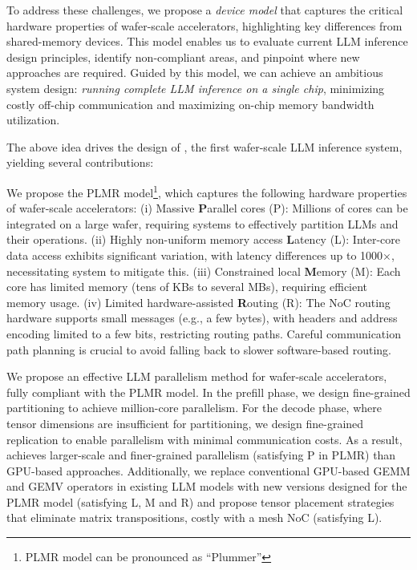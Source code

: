 To address these challenges, we propose a \emph{device model} that captures the critical hardware properties of wafer-scale accelerators, highlighting key differences from shared-memory devices. This model enables us to evaluate current LLM inference design principles, identify non-compliant areas, and pinpoint where new approaches are required. Guided by this model, we can achieve an ambitious system design: \emph{running complete LLM inference on a single chip}, minimizing costly off-chip communication and maximizing on-chip memory bandwidth utilization.

The above idea drives the design of \sys, the first wafer-scale LLM inference system, yielding several contributions:

We propose the PLMR model\footnote{PLMR model can be pronounced as “Plummer” }, which captures the following hardware properties of wafer-scale accelerators:
(i) Massive \textbf{P}arallel cores (P): Millions of cores can be integrated on a large wafer, requiring systems to effectively partition LLMs and their operations.
(ii) Highly non-uniform memory access \textbf{L}atency (L): Inter-core data access exhibits significant variation, with latency differences up to 1000$\times$, necessitating system to mitigate this.
(iii) Constrained local \textbf{M}emory (M): Each core has limited memory (tens of KBs to several MBs), requiring efficient memory usage.
(iv) Limited hardware-assisted \textbf{R}outing (R): The NoC routing hardware supports small messages (e.g., a few bytes), with headers and address encoding limited to a few bits, restricting routing paths. Careful communication path planning is crucial to avoid falling back to slower software-based routing.

We propose an effective LLM parallelism method for wafer-scale accelerators, fully compliant with the PLMR model. In the prefill phase, we design fine-grained partitioning to achieve million-core parallelism. For the decode phase, where tensor dimensions are insufficient for partitioning, we design fine-grained replication to enable parallelism with minimal communication costs. As a result, \sys achieves larger-scale and finer-grained parallelism (satisfying P in PLMR) than GPU-based approaches. Additionally, we replace conventional GPU-based GEMM and GEMV operators in existing LLM models with new versions designed for the PLMR model (satisfying L, M and R) and propose tensor placement strategies that eliminate matrix transpositions, costly with a mesh NoC (satisfying L). 

